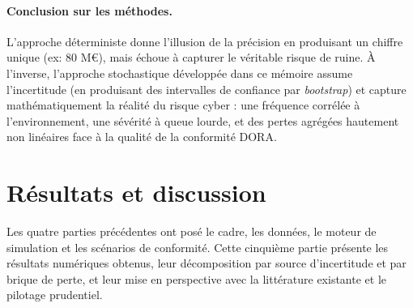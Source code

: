 \documentclass[11pt,a4paper]{article}
\theoremstyle{navystyle}
\theoremstyle{navydef}
\begin{document}
\paragraph{Conclusion sur les méthodes.} L'approche déterministe donne l'illusion de la précision en produisant un chiffre unique (ex: 80 M\euro), mais échoue à capturer le véritable risque de ruine. À l'inverse, l'approche stochastique développée dans ce mémoire assume l'incertitude (en produisant des intervalles de confiance par \textit{bootstrap}) et capture mathématiquement la réalité du risque cyber : une fréquence corrélée à l'environnement, une sévérité à queue lourde, et des pertes agrégées hautement non linéaires face à la qualité de la conformité DORA.

\section{Résultats et discussion}

Les quatre parties précédentes ont posé le cadre, les données, le moteur de
simulation et les scénarios de conformité. Cette cinquième partie présente
les résultats numériques obtenus, leur décomposition par source d'incertitude
et par brique de perte, et leur mise en perspective avec la littérature
existante et le pilotage prudentiel.
\end{document}
